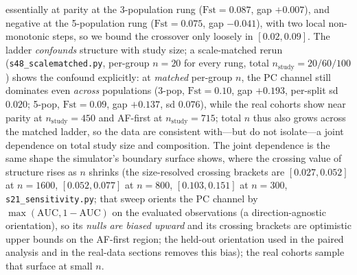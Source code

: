 \documentclass[11pt]{article}
\begin{document}
essentially at parity at the 3-population rung ($\text{Fst}{=}0.087$, gap
$+0.007$), and negative at the 5-population rung ($\text{Fst}{=}0.075$, gap
$-0.041$), with two local non-monotonic steps, so we
bound the crossover only loosely in $[0.02,0.09]$. The ladder
\emph{confounds} structure with study size; a scale-matched rerun
(\texttt{s48\_scalematched.py}, per-group $n{=}20$ for every rung, total
$n_{\text{study}}{=}20/60/100$) shows the confound explicitly: at \emph{matched}
per-group $n$, the PC channel still dominates even
\emph{across} populations (3-pop, $\text{Fst}{=}0.10$, gap $+0.193$, per-split
sd $0.020$; 5-pop, $\text{Fst}{=}0.09$, gap $+0.137$, sd $0.076$), while
the real cohorts show near parity at
$n_{\text{study}}{=}450$ and AF-first at $n_{\text{study}}{=}715$; total $n$ thus
also grows across the
matched ladder, so the data are consistent with---but do not isolate---a joint
dependence on total study size and composition. The joint
dependence is the same
shape the simulator's boundary surface shows, where the crossing value of
structure rises as $n$ shrinks (the size-resolved crossing brackets are
$[0.027,0.052]$ at $n{=}1600$, $[0.052,0.077]$ at $n{=}800$,
$[0.103,0.151]$ at $n{=}300$, \texttt{s21\_sensitivity.py}; that sweep orients
the PC channel by $\max(\text{AUC},1-\text{AUC})$ on the evaluated observations
(a direction-agnostic orientation), so its \emph{nulls are biased upward}
and its crossing brackets are optimistic
upper bounds on the AF-first region; the held-out orientation used in the
paired analysis and in the real-data sections removes this bias); the real cohorts
sample that surface at small $n$.
\end{document}
